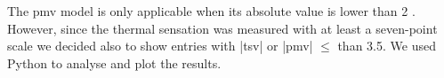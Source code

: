 The \ac{pmv} model is only applicable when its absolute value is lower than 2 \cite{Fanger1970, iso7730}.
However, since the thermal sensation was measured with at least a seven-point scale we decided also to show entries with |\ac{tsv}| or |\ac{pmv}| $\leq$ than 3.5.
We used Python to analyse and plot the results.